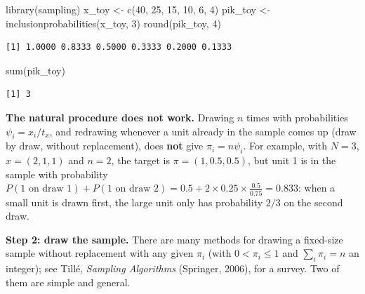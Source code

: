 \documentclass[
  letterpaper,
  DIV=11,
  numbers=noendperiod]{scrreprt}
\newenvironment{Shaded}{\begin{snugshade}}{\end{snugshade}}
\newcommand{\DecValTok}[1]{\textcolor[rgb]{0.68,0.00,0.00}{#1}}
\newcommand{\FunctionTok}[1]{\textcolor[rgb]{0.28,0.35,0.67}{#1}}
\newcommand{\NormalTok}[1]{\textcolor[rgb]{0.00,0.23,0.31}{#1}}
\newcommand{\OtherTok}[1]{\textcolor[rgb]{0.00,0.23,0.31}{#1}}
\renewcommand{\[}{\begin{equation}}
\renewcommand{\]}{\end{equation}}
\begin{document}
\begin{Shaded}
\begin{Highlighting}[]
\FunctionTok{library}\NormalTok{(sampling)}
\NormalTok{x\_toy }\OtherTok{\textless{}{-}} \FunctionTok{c}\NormalTok{(}\DecValTok{40}\NormalTok{, }\DecValTok{25}\NormalTok{, }\DecValTok{15}\NormalTok{, }\DecValTok{10}\NormalTok{, }\DecValTok{6}\NormalTok{, }\DecValTok{4}\NormalTok{)}
\NormalTok{pik\_toy }\OtherTok{\textless{}{-}} \FunctionTok{inclusionprobabilities}\NormalTok{(x\_toy, }\DecValTok{3}\NormalTok{)}
\FunctionTok{round}\NormalTok{(pik\_toy, }\DecValTok{4}\NormalTok{)}
\end{Highlighting}
\end{Shaded}

\begin{verbatim}
[1] 1.0000 0.8333 0.5000 0.3333 0.2000 0.1333
\end{verbatim}

\begin{Shaded}
\begin{Highlighting}[]
\FunctionTok{sum}\NormalTok{(pik\_toy)}
\end{Highlighting}
\end{Shaded}

\begin{verbatim}
[1] 3
\end{verbatim}

\textbf{The natural procedure does not work.} Drawing \(n\) times with
probabilities \(\psi_i=x_i/t_x\), and redrawing whenever a unit already
in the sample comes up (draw by draw, without replacement), does
\textbf{not} give \(\pi_i=n\psi_i\). For example, with \(N=3\),
\(x=(2,1,1)\) and \(n=2\), the target is \(\pi=(1,0.5,0.5)\), but unit 1
is in the sample with probability
\(P(\text{1 on draw 1})+P(\text{1 on draw 2})=0.5+2\times0.25\times\frac{0.5}{0.75}=0.833\):
when a small unit is drawn first, the large unit only has probability
\(2/3\) on the second draw.

\textbf{Step 2: draw the sample.} There are many methods for drawing a
fixed-size sample without replacement with any given \(\pi_i\) (with
\(0<\pi_i\le1\) and \(\sum_i\pi_i=n\) an integer); see Tillé,
\emph{Sampling Algorithms} (Springer, 2006), for a survey. Two of them
are simple and general.
\end{document}
